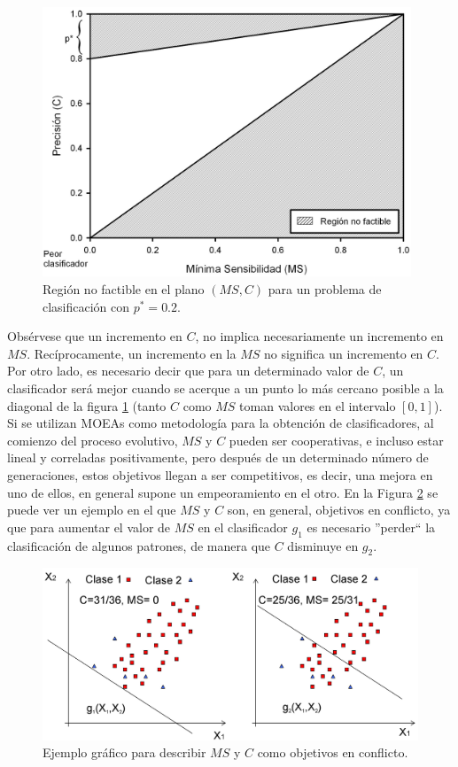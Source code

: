 \begin{figure}[htb]
\centering
\includegraphics[keepaspectratio,width=11cm]{figuras/regionFactible.jpg}
\caption{Región no factible en el plano $\left(MS,C\right)$ para un
problema de clasificación con $p^*=0.2$.}
\label{regionFactible}
\end{figure}

Obsérvese que un incremento en $C$, no implica necesariamente un incremento
en $MS$. Recíprocamente, un incremento en la $MS$ no significa un
incremento en $C$. Por otro lado, es necesario decir que para un determinado
valor de $C$, un clasificador será mejor cuando se acerque a un punto lo más cercano
posible a la diagonal de la figura \ref{regionFactible} (tanto $C$ como $MS$ toman valores en el
intervalo
$\left[0,1\right]$). Si se utilizan MOEAs como metodología para
la obtención de clasificadores, al comienzo del proceso evolutivo, $MS$ y $C$ pueden ser
cooperativas, e incluso estar lineal y correladas positivamente, pero después de un
determinado número de generaciones, estos objetivos
llegan a ser competitivos, es decir, una mejora en uno de ellos, en general supone un
empeoramiento en el otro. En la Figura \ref{CvsS} se puede ver un ejemplo en el que $MS$ y
$C$ son, en general, objetivos en conflicto, ya que para aumentar el valor de $MS$ en el
clasificador $g_{1}$ es necesario ''perder`` la clasificación de algunos patrones, de
manera que $C$ disminuye en $g_{2}$.
\begin{figure}[htb]
\centering
\includegraphics[keepaspectratio,width=12.5cm]{figuras/CvsS.jpg}
\caption{Ejemplo gráfico para describir $MS$ y $C$ como objetivos en
conflicto.}
\label{CvsS}
\end{figure}

